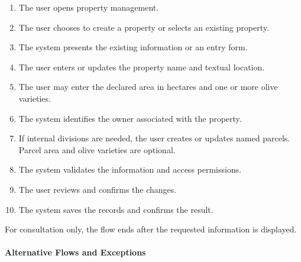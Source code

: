 \begin{enumerate}
    \item The user opens property management.
    \item The user chooses to create a property
    or selects an existing property.
    \item The system presents the existing
    information or an entry form.
    \item The user enters or updates the property
    name and textual location.
    \item The user may enter the declared area
    in hectares and one or more olive varieties.
    \item The system identifies the owner
    associated with the property.
    \item If internal divisions are needed,
    the user creates or updates named parcels.
    Parcel area and olive varieties are optional.
    \item The system validates the information
    and access permissions.
    \item The user reviews and confirms the changes.
    \item The system saves the records
    and confirms the result.
\end{enumerate}

For consultation only, the flow ends after
the requested information is displayed.

\paragraph{Alternative Flows and Exceptions}

